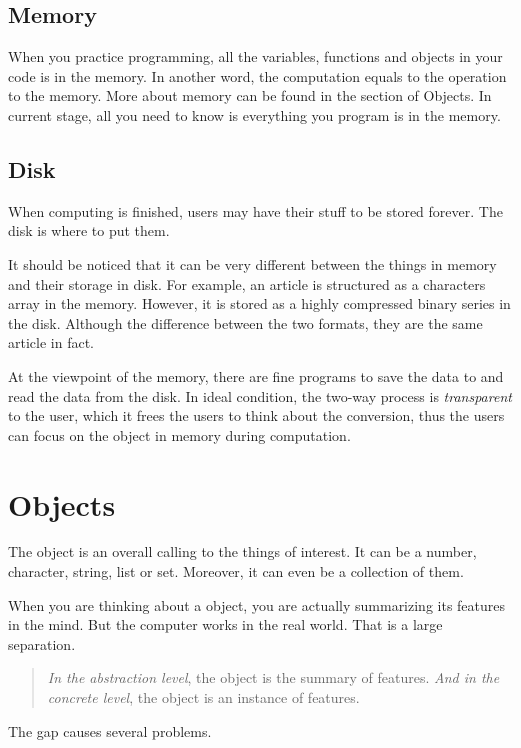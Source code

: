 

\subsection{Memory}

When you practice programming,
all the variables, functions and objects in your code is in the memory.
In another word, the computation equals to the operation to the memory.
More about memory can be found in the section of Objects.
In current stage, all you need to know is everything you program is in the memory.

\subsection{Disk}

When computing is finished,
users may have their stuff to be stored forever.
The disk is where to put them.

It should be noticed that it can be very different between the things in memory and their storage in disk.
For example, an article is structured as a characters array in the memory.
However, it is stored as a highly compressed binary series in the disk.
Although the difference between the two formats,
they are the same article in fact.

At the viewpoint of the memory, there are fine programs to save the data to and read the data from the disk.
In ideal condition, the two-way process is \emph{transparent} to the user,
which it frees the users to think about the conversion,
thus the users can focus on the object in memory during computation.

\section{Objects}

The object is an overall calling to the things of interest.
It can be a number, character, string, list or set.
Moreover, it can even be a collection of them.

When you are thinking about a object,
you are actually summarizing its features in the mind.
But the computer works in the real world.
That is a large separation.
\begin{quote}
    \emph{In the abstraction level}, the object is the summary of features.
    \emph{And in the concrete level}, the object is an instance of features.
\end{quote}
The gap causes several problems.


